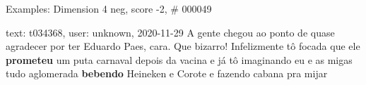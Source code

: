 \begin{frame}{Examples: Dimension 4 neg, score -2, \# 000049}
\footnotesize
\begin{alertblock}{text: t034368, user: unknown, 2020-11-29}
A gente chegou ao ponto de quase agradecer por ter Eduardo Paes, cara. Que 
bizarro! Infelizmente tô focada que ele \textbf{prometeu} um puta carnaval 
depois da vacina e já tô imaginando eu e as migas tudo aglomerada 
\textbf{bebendo} Heineken e Corote e fazendo cabana pra mijar 
\end{alertblock}
\end{frame}
